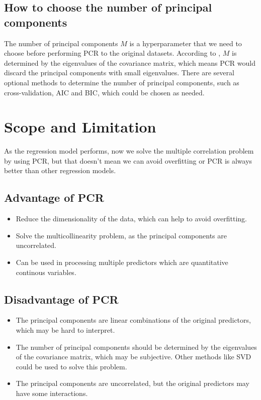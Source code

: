 \documentclass{article}
\begin{document}
\subsection{How to choose the number of principal components}
The number of principal components \(M\) is a hyperparameter that we need to choose before performing PCR to the original datasets. 
According to \parencite{hastie_2009_the}, \(M\) is determined by the eigenvalues of the covariance matrix, which means PCR would discard the principal components with small eigenvalues.
There are several optional methods to determine the number of principal components, such as cross-validation, AIC and BIC, which could be chosen as needed.

\section{Scope and Limitation}
As the regression model performs, now we solve the multiple correlation problem by using PCR, but that doesn't mean we can avoid overfitting or PCR is always better than other regression models.

\subsection{Advantage of PCR}
\begin{itemize}
    \item Reduce the dimensionality of the data, which can help to avoid overfitting.
    \item Solve the multicollinearity problem, as the principal components are uncorrelated.
    \item Can be used in processing multiple predictors which are quantitative continous variables.
\end{itemize}
\subsection{Disadvantage of PCR}
\begin{itemize}
    \item The principal components are linear combinations of the original predictors, which may be hard to interpret.
    \item The number of principal components should be determined by the eigenvalues of the covariance matrix, which may be subjective. Other methods like SVD could be used to solve this problem.
    \item The principal components are uncorrelated, but the original predictors may have some interactions.
\end{itemize}

\printbibliography[title={References}]
\end{document}
